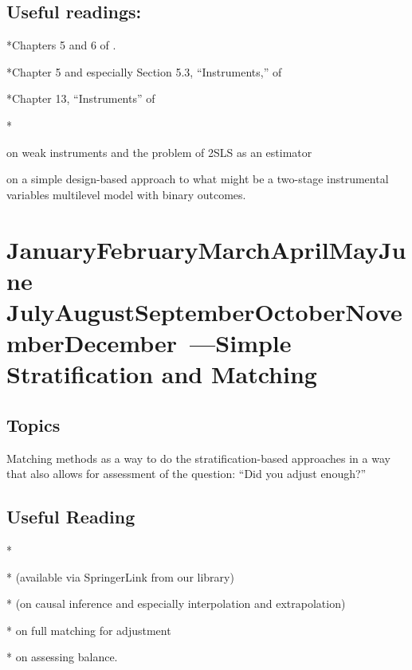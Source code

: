 \documentclass[10pt]{article}
\def\themonth{\ifcase\month\or
        January\or February\or March\or April\or May\or June\or
    July\or August\or September\or October\or November\or December\fi}
\begin{document}
\subsection{Useful readings:}

*Chapters 5 and 6 of .

*Chapter 5 and especially Section 5.3, ``Instruments,'' of 

*Chapter 13, ``Instruments'' of 

*



 on weak instruments and the problem of 2SLS as an estimator


 on a simple design-based approach to what might be
a two-stage instrumental variables multilevel model with binary outcomes.

    \AdvanceDate[7]
    \section{\themonth~\the\day---Simple Stratification and Matching}

    \subsection{Topics} Matching methods as a way to do the
    stratification-based approaches in a way that also allows for assessment of the
    question: ``Did you adjust enough?''

    \subsection{Useful Reading}

    *

    * (available via SpringerLink from our library)

    * (on causal inference and especially interpolation and extrapolation)

    * on full matching for adjustment

    * on assessing balance.
\end{document}
